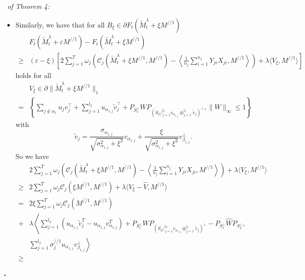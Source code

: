 \documentclass[12pt]{article}
\newenvironment{pf}{{\noindent\it Proof}\ }{\hfill $\square$\par}
\begin{document}
\begin{pf}{\it of Theorem 4:}
\begin{itemize}
  which means that
  \begin{equation}
  \label{re_b}
  F_t(\widetilde{M}_t^\lambda +\varepsilon M^{//})- F_t(\widetilde{M}_t^\lambda)\ge \varepsilon^2 \mu\|M^{//}\|_2^2.
  \end{equation}
  \item[c.] Similarly, we have that for all $B_\xi \in \partial F_t(\widetilde{M}_t^\lambda +\xi M^{//1})$
  \begin{equation*}
  \begin{aligned}
  &F_t(\widetilde{M}_t^\lambda +\varepsilon M^{//1})- F_t(\widetilde{M}_t^\lambda +\xi M^{//1})  \\\ge &
  (\varepsilon-\xi)\left[2\sum_{j=1}^T \omega_j \left(\mathcal{C}_j( \widetilde{M}_t^\lambda + \xi M^{//1}, M^{//1}) - \left\langle\frac{1}{n_j}\sum_{i=1}^{n_j}Y_{j i}X_{j i},M^{//1}\right\rangle\right) +\lambda \langle V_\xi,M^{//1}\rangle \right]
  \end{aligned}
  \end{equation*}
  holds for all
  \begin{align*}&V_\xi \in \partial \|\widetilde{M}_t^\lambda +\xi M^{//1}\|_1  \\=&\left\{\sum_{j\not\in \alpha_{1}}u_j v_j^\top +\sum_{j=1}^{l_3}u_{\alpha_{1,j}}\widetilde{v}_j^\top + P_{S_1^\perp}W P_{(S_2/_{j=1}^{l_3}v_{\alpha_{1,j}}\oplus_{j=1}^{l_3} \widetilde{v}_{j})^\perp},\|W\|_{\infty}\le 1\right\}\end{align*}
  with $$\widetilde{v}_j=\frac{\sigma_{\alpha_{1,j}}}{\sqrt{\sigma^2_{\alpha_{1,j}} + \xi^2}}v_{\alpha_{1,j}} +\frac{\xi}{\sqrt{\sigma^2_{\alpha_{1,j}} + \xi^2}}v^{\perp}_{\beta_{1,j}}.$$
  So we have 
  \begin{equation*}
  \begin{aligned}
  &2\sum_{j=1}^T \omega_j \left(\mathcal{C}_j( \widetilde{M}_t^\lambda + \xi M^{//1}, M^{//1})- \left\langle\frac{1}{n_j}\sum_{i=1}^{n_j}Y_{j i}X_{j i},M^{//1}\right\rangle\right) +\lambda \langle V_\xi,M^{//1}\rangle
  \\\ge &
  2\sum_{j=1}^T \omega_j \mathcal{C}_j( \xi M^{//1},M^{//1}) + \lambda\langle V_\xi - \widehat{V},M^{//1}\rangle \\=&
  2\xi \sum_{j=1}^T \omega_j \mathcal{C}_j(M^{//1},M^{//1}) \\+&\lambda \left\langle  \sum_{j=1}^{l_3}\left(u_{\alpha_{1,j}}\widetilde{v}_j^T - u_{\alpha_{1,j}}v_{\alpha_{1,j}}^T\right)+ P_{S_1^\perp} W P_{(S_2/_{j=1}^{l_3}v_{\alpha_{1,j}}\oplus_{j=1}^{l_3} \widetilde{v}_{j})^\perp} - P_{S_1^\perp}\widehat{W}P_{S_2^\perp}\right.,\\&\left. \sum_{j=1}^{l_3}\sigma_j^{//1} u_{\alpha_{1,j}}v_{\beta_{1,j}}^\perp \right\rangle \\\ge &

\end{aligned}
\end{equation*}
\end{itemize}
\end{pf}
\end{document}
